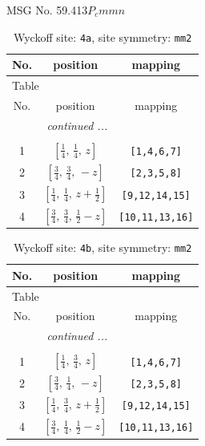 \documentclass[fleqn,8pt]{jsarticle}
\begin{document}
\setcounter{MaxMatrixCols}{32}

\renewcommand{\tablename}{Table~}
\renewcommand{\figurename}{Figure~}
\begin{center}
\LARGE
MSG No. 59.413\quad$P_{c}mmn$
\end{center}
\renewcommand{\arraystretch}{1.2}
\begin{longtable}{ccc}
\caption{Wyckoff site: {\tt 4a}, site symmetry: {\tt mm2}}
 \\
 \hline \hline
No. & position & mapping \\ \hline \endfirsthead

\multicolumn{2}{l}{\tablename\ \thetable{}} \\
 \hline \hline
No. & position & mapping \\ \hline \endhead

 \hline \hline
\multicolumn{2}{r}{\footnotesize\it continued ...} \\ \endfoot

 \hline \hline
\multicolumn{2}{r}{} \\ \endlastfoot

1 & $\left[ \frac{1}{4},\, \frac{1}{4},\, z \right]$ & {\tt [1,4,6,7]} \\ \hline
2 & $\left[ \frac{3}{4},\, \frac{3}{4},\, - z \right]$ & {\tt [2,3,5,8]} \\ \hline
3 & $\left[ \frac{1}{4},\, \frac{1}{4},\, z + \frac{1}{2} \right]$ & {\tt [9,12,14,15]} \\ \hline
4 & $\left[ \frac{3}{4},\, \frac{3}{4},\, \frac{1}{2} - z \right]$ & {\tt [10,11,13,16]} \\
\end{longtable}
\renewcommand{\arraystretch}{1.2}
\begin{longtable}{ccc}
\caption{Wyckoff site: {\tt 4b}, site symmetry: {\tt mm2}}
 \\
 \hline \hline
No. & position & mapping \\ \hline \endfirsthead

\multicolumn{2}{l}{\tablename\ \thetable{}} \\
 \hline \hline
No. & position & mapping \\ \hline \endhead

 \hline \hline
\multicolumn{2}{r}{\footnotesize\it continued ...} \\ \endfoot

 \hline \hline
\multicolumn{2}{r}{} \\ \endlastfoot

1 & $\left[ \frac{1}{4},\, \frac{3}{4},\, z \right]$ & {\tt [1,4,6,7]} \\ \hline
2 & $\left[ \frac{3}{4},\, \frac{1}{4},\, - z \right]$ & {\tt [2,3,5,8]} \\ \hline
3 & $\left[ \frac{1}{4},\, \frac{3}{4},\, z + \frac{1}{2} \right]$ & {\tt [9,12,14,15]} \\ \hline
4 & $\left[ \frac{3}{4},\, \frac{1}{4},\, \frac{1}{2} - z \right]$ & {\tt [10,11,13,16]} \\
\end{longtable}
\end{document}
